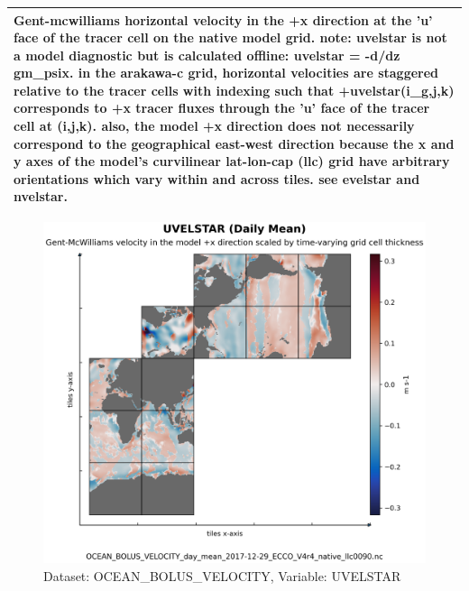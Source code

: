 \begin{longtable}{|m{}|m{}|m{}|m{}|}
\multicolumn{4}{|p{1\textwidth}|}{Gent-mcwilliams horizontal velocity in the +x direction at the 'u' face of the tracer cell on the native model grid. note: uvelstar is not a model diagnostic but is calculated offline: uvelstar = -d/dz gm\_psix. in the arakawa-c grid, horizontal velocities are staggered relative to the tracer cells with indexing such that +uvelstar(i\_g,j,k) corresponds to +x tracer fluxes through the 'u' face of the tracer cell at (i,j,k). also, the model +x direction does not necessarily correspond to the geographical east-west direction because the x and y axes of the model's curvilinear lat-lon-cap (llc) grid have arbitrary orientations which vary within and across tiles. see evelstar and nvelstar.} \\ \hline
\end{longtable}

\begin{figure}[H]
\centering
\includegraphics[scale=0.55]{../images/plots/native_plots/Gent-McWilliams_Ocean_Bolus_Velocity/UVELSTAR.png}
\caption{Dataset: OCEAN\_BOLUS\_VELOCITY, Variable: UVELSTAR}
\label{tab:table-OCEAN_BOLUS_VELOCITY_UVELSTAR-Plot}
\end{figure}
\pagebreak
